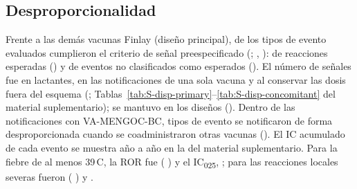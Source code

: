 \documentclass[11pt]{article}
\begin{document}
\subsection{Desproporcionalidad}\label{sec:r-disp}
Frente a las demás vacunas Finlay (diseño principal), \POSignalsPrimaryFinlayVaccines{} de los
\PONEventsScreened{} tipos de evento evaluados cumplieron el criterio de señal preespecificado (\POSignalList;
, ): \PONSignalsExpectedPhrase{} de reacciones
esperadas (\POSignalExpectedList) y \PONSignalsEmergingPhrase{} de eventos no clasificados como
esperados (\POSignalEmergingList). El número de señales fue \POSignalsInfantFinlayComparator{} en
lactantes, \POSignalsExcludingCoadministration{} en las notificaciones de una sola vacuna y
\POSignalsPrimaryIncludingScheduleErrors{} al conservar las dosis fuera del esquema
(; Tablas~\ref{tab:S-disp-primary}--\ref{tab:S-disp-concomitant} del material
suplementario); \PONSignalsRobustPhrase{} se mantuvo en los \PONDesigns{} diseños
(\POSignalRobustList). Dentro de las notificaciones con VA-MENGOC-BC, \PONConcomitantSignals{} tipos
de evento se notificaron de forma desproporcionada cuando se coadministraron otras vacunas
(\POConcomitantSignalList). El IC
acumulado de cada evento se muestra año a año en la  del material
suplementario. Para la fiebre de al menos 39\,\textdegree{}C, la ROR fue \POEvFeverThreeNineROR{}
(\CI{} \POEvFeverThreeNineRORCI) y el IC\textsubscript{025}, \POEvFeverThreeNineICLow; para las
reacciones locales severas fueron \POEvSevereLocalReactionROR{} (\CI{}
\POEvSevereLocalReactionRORCI) y \POEvSevereLocalReactionICLow.

\begin{table}[tbp]
\centering\small
\caption{Desproporcionalidad de los eventos notificados con VA-MENGOC-BC frente a las demás
vacunas Finlay (diseño principal), para los eventos con al menos \VMinCell{} notificaciones. $a$,
notificaciones con VA-MENGOC-BC y el evento; $E$, valor esperado de $a$; IC\textsubscript{025},
límite inferior de credibilidad del 95\,\% del componente de información; EB\textsubscript{05},
percentil 5 inferior de la media geométrica bayesiana empírica; Métodos, número de los cuatro métodos
que cumplen sus umbrales; Señal, criterio preespecificado (IC\textsubscript{025}${}>0$,
$a\geq\PODispMinReports$).}
\label{tab:disproportionality}
\POTableDispMain
\end{table}

\begin{table}[tbp]
\centering\small
\caption{Número de señales de desproporcionalidad en los cuatro diseños de comparación
preespecificados y en el análisis de las vacunas concomitantes.}
\label{tab:designs}
\POTableDesigns
\end{table}
\end{document}
